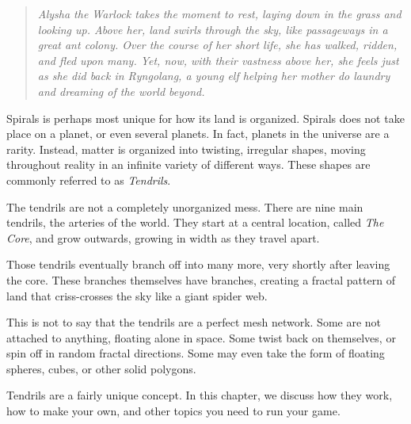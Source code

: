 
\begin{quote}
\itshape
Alysha the Warlock takes the moment to rest, laying down in the grass and looking up.
Above her, land swirls through the sky, like passageways in a great ant colony.
Over the course of her short life, she has walked, ridden, and fled upon many.
Yet, now, with their vastness above her, she feels just as she did back in Ryngolang, a young elf helping her mother do laundry and dreaming of the world beyond.
\end{quote}

Spirals is perhaps most unique for how its land is organized.
Spirals does not take place on a planet, or even several planets.
In fact, planets in the universe are a rarity.
Instead, matter is organized into twisting, irregular shapes, moving throughout reality in an infinite variety of different ways.
These shapes are commonly referred to as \textit{Tendrils}.

The tendrils are not a completely unorganized mess.
There are nine main tendrils, the arteries of the world.
They start at a central location, called \textit{The Core}, and grow outwards, growing in width as they travel apart.

Those tendrils eventually branch off into many more, very shortly after leaving the core.
These branches themselves have branches, creating a fractal pattern of land that criss-crosses the sky like a giant spider web.

This is not to say that the tendrils are a perfect mesh network.
Some are not attached to anything, floating alone in space.
Some twist back on themselves, or spin off in random fractal directions.
Some may even take the form of floating spheres, cubes, or other solid polygons.

Tendrils are a fairly unique concept.
In this chapter, we discuss how they work, how to make your own, and other topics you need to run your game.


